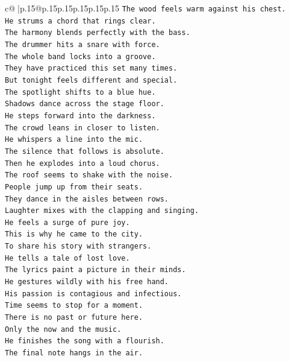\documentclass{article}
\begin{document}
{\begin{supertabular}{c@{$\;$}|p{.15\linewidth}@{}p{.15\linewidth}p{.15\linewidth}p{.15\linewidth}p{.15\linewidth}p{.15\linewidth}}
{{{\texttt{The wood feels warm against his chest.} \\
\texttt{He strums a chord that rings clear.} \\
\texttt{The harmony blends perfectly with the bass.} \\
\texttt{The drummer hits a snare with force.} \\
\texttt{The whole band locks into a groove.} \\
\texttt{They have practiced this set many times.} \\
\texttt{But tonight feels different and special.} \\
\texttt{The spotlight shifts to a blue hue.} \\
\texttt{Shadows dance across the stage floor.} \\
\texttt{He steps forward into the darkness.} \\
\texttt{The crowd leans in closer to listen.} \\
\texttt{He whispers a line into the mic.} \\
\texttt{The silence that follows is absolute.} \\
\texttt{Then he explodes into a loud chorus.} \\
\texttt{The roof seems to shake with the noise.} \\
\texttt{People jump up from their seats.} \\
\texttt{They dance in the aisles between rows.} \\
\texttt{Laughter mixes with the clapping and singing.} \\
\texttt{He feels a surge of pure joy.} \\
\texttt{This is why he came to the city.} \\
\texttt{To share his story with strangers.} \\
\texttt{He tells a tale of lost love.} \\
\texttt{The lyrics paint a picture in their minds.} \\
\texttt{He gestures wildly with his free hand.} \\
\texttt{His passion is contagious and infectious.} \\
\texttt{Time seems to stop for a moment.} \\
\texttt{There is no past or future here.} \\
\texttt{Only the now and the music.} \\
\texttt{He finishes the song with a flourish.} \\
\texttt{The final note hangs in the air.} \\
}}}
\end{supertabular}}
\end{document}
